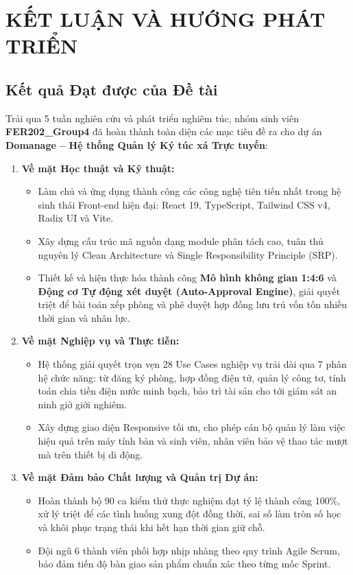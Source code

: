 \chapter{KẾT LUẬN VÀ HƯỚNG PHÁT TRIỂN}
\label{ch:conclusion}

\section{Kết quả Đạt được của Đề tài}
Trải qua 5 tuần nghiên cứu và phát triển nghiêm túc, nhóm sinh viên \textbf{FER202\_Group4} đã hoàn thành toàn diện các mục tiêu đề ra cho dự án \textbf{Domanage -- Hệ thống Quản lý Ký túc xá Trực tuyến}:
\begin{enumerate}
    \item \textbf{Về mặt Học thuật và Kỹ thuật:}
    \begin{itemize}
        \item Làm chủ và ứng dụng thành công các công nghệ tiên tiến nhất trong hệ sinh thái Front-end hiện đại: React 19, TypeScript, Tailwind CSS v4, Radix UI và Vite.
        \item Xây dựng cấu trúc mã nguồn dạng module phân tách cao, tuân thủ nguyên lý Clean Architecture và Single Responsibility Principle (SRP).
        \item Thiết kế và hiện thực hóa thành công \textbf{Mô hình không gian 1:4:6} và \textbf{Động cơ Tự động xét duyệt (Auto-Approval Engine)}, giải quyết triệt để bài toán xếp phòng và phê duyệt hợp đồng lưu trú vốn tốn nhiều thời gian và nhân lực.
    \end{itemize}

    \item \textbf{Về mặt Nghiệp vụ và Thực tiễn:}
    \begin{itemize}
        \item Hệ thống giải quyết trọn vẹn 28 Use Cases nghiệp vụ trải dài qua 7 phân hệ chức năng: từ đăng ký phòng, hợp đồng điện tử, quản lý công tơ, tính toán chia tiền điện nước minh bạch, bảo trì tài sản cho tới giám sát an ninh giờ giới nghiêm.
        \item Xây dựng giao diện Responsive tối ưu, cho phép cán bộ quản lý làm việc hiệu quả trên máy tính bàn và sinh viên, nhân viên bảo vệ thao tác mượt mà trên thiết bị di động.
    \end{itemize}

    \item \textbf{Về mặt Đảm bảo Chất lượng và Quản trị Dự án:}
    \begin{itemize}
        \item Hoàn thành bộ 90 ca kiểm thử thực nghiệm đạt tỷ lệ thành công 100\%, xử lý triệt để các tình huống xung đột đồng thời, sai số làm tròn số học và khôi phục trạng thái khi hết hạn thời gian giữ chỗ.
        \item Đội ngũ 6 thành viên phối hợp nhịp nhàng theo quy trình Agile Scrum, bảo đảm tiến độ bàn giao sản phẩm chuẩn xác theo từng mốc Sprint.
    \end{itemize}
\end{enumerate}

